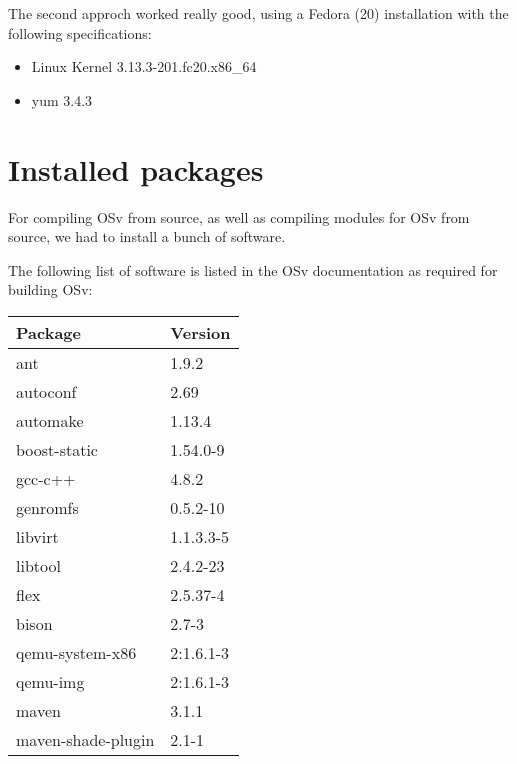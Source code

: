     The second approch worked really good, using a Fedora (20) installation with
    the following specifications:

        \begin{itemize}
            \item Linux Kernel 3.13.3-201.fc20.x86\_64
            \item yum 3.4.3
        \end{itemize}

    \section{Installed packages}

        For compiling OSv from source, as well as compiling modules for OSv from
        source, we had to install a bunch of software.

        The following list of software is listed in the OSv documentation as
        required for building OSv:

            \begin{tabular}{ll}
                Package             & Version   \\
                \hline

                ant                 & 1.9.2     \\
                autoconf            & 2.69      \\
                automake            & 1.13.4    \\
                boost-static        & 1.54.0-9  \\
                gcc-c++             & 4.8.2     \\
                genromfs            & 0.5.2-10  \\
                libvirt             & 1.1.3.3-5 \\
                libtool             & 2.4.2-23  \\
                flex                & 2.5.37-4  \\
                bison               & 2.7-3     \\
                qemu-system-x86     & 2:1.6.1-3 \\
                qemu-img            & 2:1.6.1-3 \\
                maven               & 3.1.1     \\
                maven-shade-plugin  & 2.1-1     \\
            \end{tabular}

